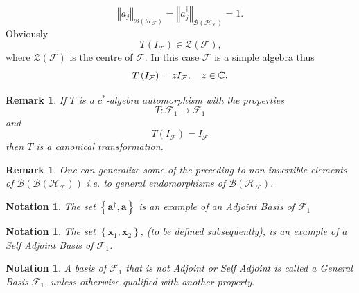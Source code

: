 \documentclass[aps, preprint]{revtex4}
\newtheorem{notation}[theorem]{Notation}
\newtheorem{remark}[theorem]{Remark}
\begin{document}
\begin{equation}\left \Vert a_{j}\right \Vert _{\mathcal{B} \left (\mathcal{H}_{\mathcal{F}}\right )} =\left \Vert a_{j}^{ \dag }\right \Vert _{\mathcal{B} \left (\mathcal{H}_{\mathcal{F}}\right )} =1.
\end{equation}Obviously
\begin{equation}T \left (I_{\mathcal{F}}\right ) \in \mathcal{Z} \left (\mathcal{F}\right )\text{,}
\end{equation}where $\mathcal{Z} \left (\mathcal{F}\right )$ is the centre of $\mathcal{F}$. In this case $\mathcal{F}$ is a simple algebra thus
\begin{equation}T \left (I_{\mathcal{F}}\right ) =z I_{\mathcal{F}} ,\text{\quad }z \in \mathbb{C}\text{.}
\end{equation}


\begin{remark}
If $T$ is a $c^{ \ast }$\emph{-algebra automorphism with the properties }
\begin{equation}T :\mathcal{F}_{1} \rightarrow \mathcal{F}_{1}
\end{equation}and
\begin{equation}T \left (I_{\mathcal{F}}\right ) =I_{\mathcal{F}}
\end{equation}then $T$ is a \emph{canonical transformation}. 
\end{remark}


\begin{remark}
One can generalize some of the preceding to non invertible elements of $\mathcal{B} \left (\mathcal{B} \left (\mathcal{H}_{\mathcal{F}}\right )\right )$ i.e. to general endomorphisms of $\mathcal{B} \left (\mathcal{H}_{\mathcal{F}}\right )\text{.}$ 
\end{remark}


\begin{notation}
The set $\left \{\mathbf{a}^{ \dag } ,\mathbf{a}\right \}$ is an example of an \emph{Adjoint Basis }of $\mathcal{F}_{1}$ 
\end{notation}


\begin{notation}
The set $\left \{\mathbf{x}_{1} ,\mathbf{x}_{2}\right \}\text{,}$ (to be defined subsequently), is an example of a \emph{Self Adjoint Basis }of $\mathcal{F}_{1}$. 
\end{notation}


\begin{notation}
A basis of $\mathcal{F}_{1}$ that is not \emph{Adjoint} or \emph{Self Adjoint }is called a \emph{General Basis}
$\mathcal{F}_{1}\text{,}$ unless otherwise qualified with another property$\text{.}$ 
\end{notation}
\end{document}
